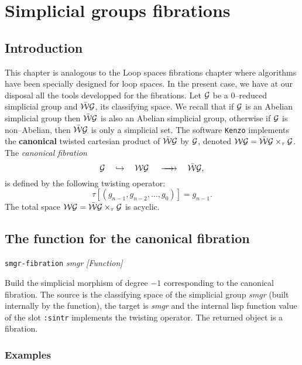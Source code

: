 \chapter {Simplicial groups fibrations}

\section {Introduction}

This chapter is analogous to the  Loop spaces fibrations chapter  
where  algorithms have been specially designed for loop spaces. In the present case, we have at our
disposal all the tools developped for the fibrations. Let ${\cal G}$
be a $0$--reduced simplicial group and $\bar{\cal W}{\cal G}$, its
classifying space.  We recall that if ${\cal G}$ is
an Abelian simplicial group then $\bar{\cal W}{\cal G}$ is also an Abelian
simplicial group, otherwise if ${\cal G}$ is non--Abelian, then $\bar{\cal W}{\cal G}$
is only a simplicial set. The software {\tt Kenzo} implements the
{\bf canonical} twisted cartesian product of $\bar{\cal W}{\cal G}$ by  ${\cal G}$, 
denoted ${\cal WG}=\bar{\cal W}{\cal G} \times_\tau  {\cal G}$.
The {\em canonical fibration}
$$ {\cal G}\quad \hookrightarrow\quad  {\cal WG} \hskip 1.2em \longrightarrow \hskip -1.2em \longrightarrow  
   \quad\bar{\cal W}{\cal G},$$
is defined by the following twisting operator:
$$\tau[(g_{n-1}, g_{n-2}, \ldots, g_0)]= g_{n-1}.$$
The total space ${\cal WG}=\bar{\cal W}{\cal G} \times_\tau  {\cal G}$ is acyclic.

\section {The function for the canonical fibration}

{\parindent=0mm
{\leftskip=5mm
{\tt smgr-fibration} {\em smgr} \hfill {\em [Function]} \par}
{\leftskip=15mm
Build the simplicial morphism of degree $-1$ corresponding to the canonical fibration.
The source is the classifying space of the simplicial group {\em smgr} 
(built internally by the function), the target
is {\em smgr} and the internal lisp function value of the slot {\tt :sintr} implements
the twisting operator. The returned object is a fibration. \par}
}

\subsection* {Examples}

